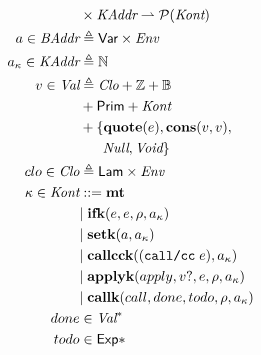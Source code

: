 \documentclass[12pt,draft]{article}
\newcommand{\callccsyn}[1]{(\texttt{call/cc}\;#1)}
\begin{document}
\begin{multicols*}{2}
\begin{align*}
                        & \times \cKAddr \rightharpoonup \mathcal{P}(\cKont) \\
    a \in \cBAddr &\triangleq \cVar \times \cEnv \\
    \ckaddr \in \cKAddr &\triangleq \mathbb{N} \\
    v \in \cVal &\triangleq \cClo + \mathbb{Z} + \mathbb{B} \\
                        & + \cPrim + \cKont \\
                        & + \{\textbf{quote}(e) , \textbf{cons}(v , v) , \\
                        & \;\;\;\;\;\; \cNull , \cVoid \} \\
    clo \in \cClo &\triangleq \cLam \times \cEnv \\
    \ckont \in \cKont &::= \textbf{mt} \\
                        &|\; \textbf{ifk}(e , e , \cenv , \ckaddr) \\
                        &|\; \textbf{setk}(a, \ckaddr) \\
                        &|\; \textbf{callcck}(\callccsyn{e} , \ckaddr) \\
                        &|\; \textbf{applyk}(apply, v? , e , \cenv , \ckaddr) \\
                        &|\; \textbf{callk}(call,done,todo,\cenv,\ckaddr) \\
    done &\in \cVal^* \\
    todo &\in \cExp* \\
  \end{align*}
\end{multicols*}


\newpage
\end{document}
